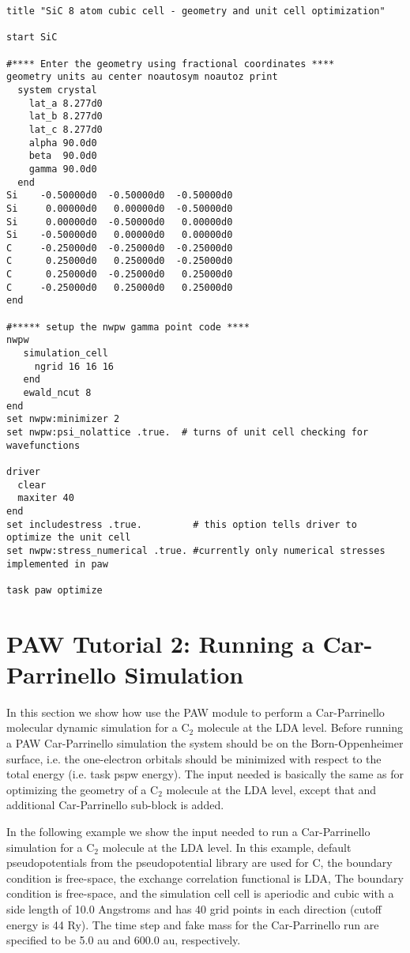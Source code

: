 \begin{verbatim}
title "SiC 8 atom cubic cell - geometry and unit cell optimization"

start SiC

#**** Enter the geometry using fractional coordinates ****
geometry units au center noautosym noautoz print
  system crystal
    lat_a 8.277d0
    lat_b 8.277d0
    lat_c 8.277d0
    alpha 90.0d0
    beta  90.0d0
    gamma 90.0d0
  end
Si    -0.50000d0  -0.50000d0  -0.50000d0
Si     0.00000d0   0.00000d0  -0.50000d0
Si     0.00000d0  -0.50000d0   0.00000d0
Si    -0.50000d0   0.00000d0   0.00000d0
C     -0.25000d0  -0.25000d0  -0.25000d0
C      0.25000d0   0.25000d0  -0.25000d0
C      0.25000d0  -0.25000d0   0.25000d0
C     -0.25000d0   0.25000d0   0.25000d0
end

#***** setup the nwpw gamma point code ****
nwpw
   simulation_cell
     ngrid 16 16 16
   end
   ewald_ncut 8
end
set nwpw:minimizer 2
set nwpw:psi_nolattice .true.  # turns of unit cell checking for wavefunctions

driver
  clear
  maxiter 40
end
set includestress .true.         # this option tells driver to optimize the unit cell
set nwpw:stress_numerical .true. #currently only numerical stresses implemented in paw

task paw optimize

\end{verbatim}



\normalsize
\section{PAW Tutorial 2: Running a Car-Parrinello Simulation}
\label{sec:pspw_cp}
\normalsize

In this section we show how use the PAW module to perform a Car-Parrinello
molecular dynamic simulation for a C$_2$ molecule at the LDA level.  
Before running a PAW Car-Parrinello  simulation the system should be
on the Born-Oppenheimer surface, i.e. the one-electron orbitals should be minimized 
with respect to the total energy (i.e. task pspw energy).  The input needed
is basically the same as for optimizing the geometry of a C$_2$ molecule at the LDA level,
except that and additional Car-Parrinello sub-block is added.  

In the following example we show the input needed to run a Car-Parrinello simulation
for a C$_2$ molecule at the LDA level.  In this example, default pseudopotentials
from the pseudopotential library are used for C, the boundary condition is free-space, 
the exchange correlation functional is LDA, The boundary condition is free-space, and 
the simulation cell cell is aperiodic and cubic with a side length of 10.0 Angstroms and has
40 grid points in each direction (cutoff energy is 44 Ry).  The time step and fake mass
for the Car-Parrinello run are specified to be 5.0 au and 600.0 au, respectively.  

